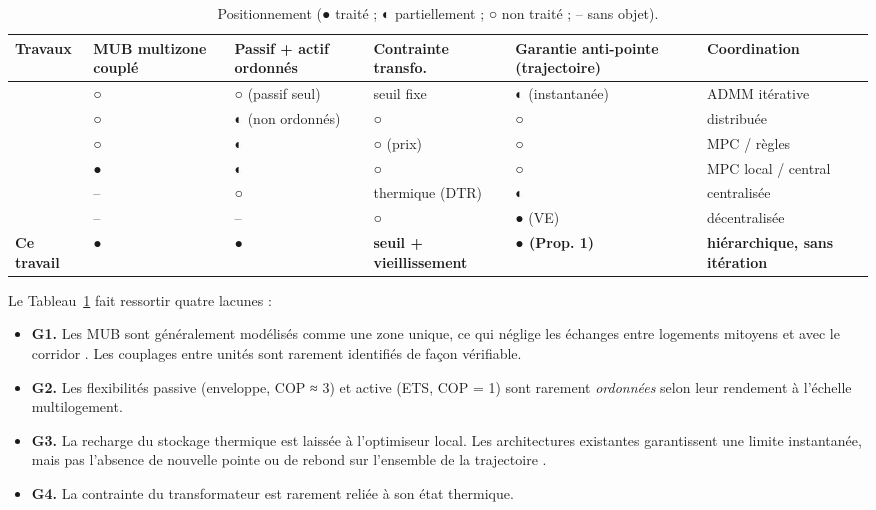 \documentclass[conference]{IEEEtran}
\providecommand{\tightlist}{\setlength{\itemsep}{0pt}\setlength{\parskip}{0pt}}
\begin{document}
\begin{table}[tb]
\centering\footnotesize
\caption{Positionnement (● traité ; ◐ partiellement ; ○ non traité ; -- sans objet).}\label{tab:I}
\begin{tabular}{>{\raggedright\arraybackslash}p{}>{\raggedright\arraybackslash}p{}>{\raggedright\arraybackslash}p{}>{\raggedright\arraybackslash}p{}>{\raggedright\arraybackslash}p{}>{\raggedright\arraybackslash}p{}}
\toprule
\textbf{Travaux} & \textbf{MUB multizone couplé} & \textbf{Passif + actif ordonnés} & \textbf{Contrainte transfo.} & \textbf{Garantie anti-pointe (trajectoire)} & \textbf{Coordination} \\
\midrule
\cite{Etedadi2023, Etedadi2025} & ○ & ○ (passif seul) & seuil fixe & ◐ (instantanée) & ADMM itérative \\
\cite{EtedadiAliabadi2022} & ○ & ◐ (non ordonnés) & ○ & ○ & distribuée \\
\cite{Vallianos2023, Morovat2022} & ○ & ◐ & ○ (prix) & ○ & MPC / règles \\
\cite{Frahm2025, Hasrat2025} & ● & ◐ & ○ & ○ & MPC local / central \\
\cite{Daminov2021} & -- & ○ & thermique (DTR) & ◐ & centralisée \\
\cite{Gan2013} & -- & -- & ○ & ● (VE) & décentralisée \\
\textbf{Ce travail} & \textbf{●} & \textbf{●} & \textbf{seuil + vieillissement} & \textbf{● (Prop. 1)} & \textbf{hiérarchique, sans itération} \\
\bottomrule
\end{tabular}
\end{table}

Le Tableau~\ref{tab:I} fait ressortir quatre lacunes :

\begin{itemize}
\tightlist
\item
  \textbf{G1.} Les MUB sont généralement modélisés comme une zone unique, ce qui néglige les échanges entre logements mitoyens et avec le corridor \cite{Cui2023, Talib2023}. Les couplages entre unités sont rarement identifiés de façon vérifiable.
\item
  \textbf{G2.} Les flexibilités passive (enveloppe, COP ≈ 3) et active (ETS, COP = 1) sont rarement \emph{ordonnées} selon leur rendement à l'échelle multilogement.
\item
  \textbf{G3.} La recharge du stockage thermique est laissée à l'optimiseur local. Les architectures existantes garantissent une limite instantanée, mais pas l'absence de nouvelle pointe ou de rebond sur l'ensemble de la trajectoire \cite{Hein2026, Arafat2024}.
\item
  \textbf{G4.} La contrainte du transformateur est rarement reliée à son état thermique.
\end{itemize}
\end{document}
